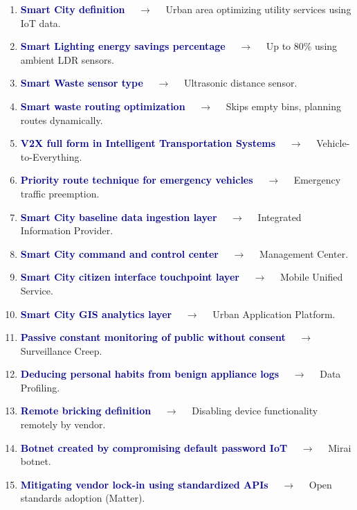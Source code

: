 \documentclass[11pt,a4paper]{article}
\begin{document}
\begin{enumerate}[label=\arabic*., leftmargin=*, labelsep=0.8em, itemsep=0.35em, parsep=0.1em, topsep=0.2em]
  \item \textcolor{darkblue}{\textbf{Smart City definition}} $\quad\to\quad$ Urban area optimizing utility services using IoT data.
  \item \textcolor{darkblue}{\textbf{Smart Lighting energy savings percentage}} $\quad\to\quad$ Up to 80\% using ambient LDR sensors.
  \item \textcolor{darkblue}{\textbf{Smart Waste sensor type}} $\quad\to\quad$ Ultrasonic distance sensor.
  \item \textcolor{darkblue}{\textbf{Smart waste routing optimization}} $\quad\to\quad$ Skips empty bins, planning routes dynamically.
  \item \textcolor{darkblue}{\textbf{V2X full form in Intelligent Transportation Systems}} $\quad\to\quad$ Vehicle-to-Everything.
  \item \textcolor{darkblue}{\textbf{Priority route technique for emergency vehicles}} $\quad\to\quad$ Emergency traffic preemption.
  \item \textcolor{darkblue}{\textbf{Smart City baseline data ingestion layer}} $\quad\to\quad$ Integrated Information Provider.
  \item \textcolor{darkblue}{\textbf{Smart City command and control center}} $\quad\to\quad$ Management Center.
  \item \textcolor{darkblue}{\textbf{Smart City citizen interface touchpoint layer}} $\quad\to\quad$ Mobile Unified Service.
  \item \textcolor{darkblue}{\textbf{Smart City GIS analytics layer}} $\quad\to\quad$ Urban Application Platform.
  \item \textcolor{darkblue}{\textbf{Passive constant monitoring of public without consent}} $\quad\to\quad$ Surveillance Creep.
  \item \textcolor{darkblue}{\textbf{Deducing personal habits from benign appliance logs}} $\quad\to\quad$ Data Profiling.
  \item \textcolor{darkblue}{\textbf{Remote bricking definition}} $\quad\to\quad$ Disabling device functionality remotely by vendor.
  \item \textcolor{darkblue}{\textbf{Botnet created by compromising default password IoT}} $\quad\to\quad$ Mirai botnet.
  \item \textcolor{darkblue}{\textbf{Mitigating vendor lock-in using standardized APIs}} $\quad\to\quad$ Open standards adoption (Matter).

\end{enumerate}
\end{document}

